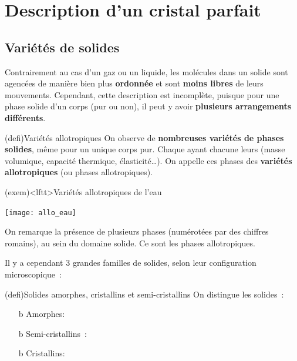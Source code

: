 \documentclass[../../main/main.tex]{subfiles}
\begin{document}
\section{Description d'un cristal parfait}
\subsection{Variétés de solides}
Contrairement au cas d'un gaz ou un liquide, les molécules dans un solide sont
agencées de manière bien plus \textbf{ordonnée} et sont \textbf{moins libres} de
leurs mouvements. Cependant, cette description est incomplète, puisque pour une
phase solide d'un corps (pur ou non), il peut y avoir \textbf{plusieurs
	arrangements différents}.
\begin{tcb}(defi){Variétés allotropiques}
	On observe de \textbf{nombreuses variétés de phases solides}, même pour un
	unique corps pur. Chaque ayant chacune leurs 
	(masse volumique, capacité thermique, élasticité…). On appelle ces phases des
	\textbf{variétés allotropiques} (ou phases allotropiques).
\end{tcb}

\begin{tcb}(exem)<lftt>{Variétés allotropiques de l'eau}
	\begin{center}
		\texttt{[image: allo\_eau]}
	\end{center}
	On remarque la présence de plusieurs phases (numérotées par des chiffres
	romains), au sein du domaine solide. Ce sont les phases allotropiques.
\end{tcb}

Il y a cependant 3 grandes familles de solides, selon leur configuration
microscopique~:
\begin{tcb}(defi){Solides amorphes, cristallins et semi-cristallins}
	On distingue les solides~:
	\begin{itemize}
		\item[b]{Amorphes}: %
		\item[b]{Semi-cristallins}~: %
		\item[b]{Cristallins}: %
	\end{itemize}
\end{tcb}
\end{document}
